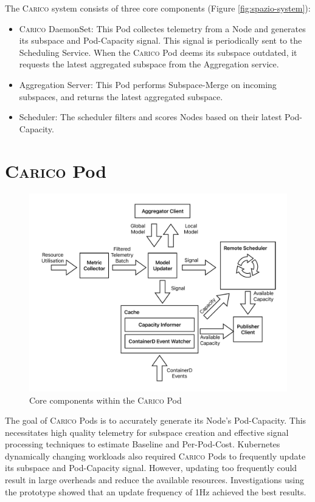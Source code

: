 The \textsc{Carico} system consists of three core components (Figure
\ref{fig:spazio-system}):
\begin{itemize}
    \item \textsc{Carico} DaemonSet: This Pod collectes telemetry from a
        Node and generates its subspace and Pod-Capacity  signal. This signal is
        periodically sent to the Scheduling Service. When the \textsc{Carico}
        Pod deems its subspace outdated, it requests the latest aggregated
        subspace from the Aggregation service.
    \item Aggregation Server: This Pod performs Subspace-Merge on incoming
        subspaces, and returns the latest aggregated subspace.
    \item Scheduler: The scheduler filters and scores Nodes based on their
        latest Pod-Capacity.
\end{itemize}

\section{\textsc{Carico} Pod}
\begin{figure}[H]
    \centering
    \includegraphics[width=\textwidth]{images/spazio-pod.pdf}
    \caption{Core components within the \textsc{Carico} Pod}
    \label{spazio-pod-components}
\end{figure}
The goal of \textsc{Carico} Pods is to accurately generate its Node's
Pod-Capacity. This necessitates high quality telemetry for subspace creation and
effective signal processing techniques to estimate Baseline and Per-Pod-Cost.
Kubernetes dynamically changing workloads also required \textsc{Carico} Pods to
frequently update its subspace and Pod-Capacity signal. However, updating too
frequently could result in large overheads and reduce the available resources.
Investigations using the prototype showed that an update frequency of 1Hz
achieved the best results.

